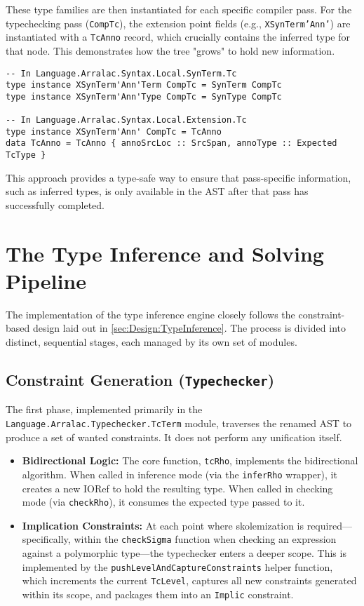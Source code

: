 These type families are then instantiated for each specific compiler pass. For the typechecking pass (\texttt{CompTc}), the extension point fields (e.g., \texttt{XSynTerm'Ann'}) are instantiated with a \texttt{TcAnno} record, which crucially contains the inferred type for that node. This demonstrates how the tree "grows" to hold new information.

\begin{verbatim}
-- In Language.Arralac.Syntax.Local.SynTerm.Tc
type instance XSynTerm'Ann'Term CompTc = SynTerm CompTc
type instance XSynTerm'Ann'Type CompTc = SynType CompTc

-- In Language.Arralac.Syntax.Local.Extension.Tc
type instance XSynTerm'Ann' CompTc = TcAnno
data TcAnno = TcAnno { annoSrcLoc :: SrcSpan, annoType :: Expected TcType }
\end{verbatim}

This approach provides a type-safe way to ensure that pass-specific information, such as inferred types, is only available in the AST after that pass has successfully completed.

\section{The Type Inference and Solving Pipeline}
\label{sec:Implementation:Pipeline}

The implementation of the type inference engine closely follows the constraint-based design laid out in \cref{sec:Design:TypeInference}. The process is divided into distinct, sequential stages, each managed by its own set of modules.

\subsection{Constraint Generation (\texttt{Typechecker})}
The first phase, implemented primarily in the \\ \texttt{Language.Arralac.Typechecker.TcTerm} module, traverses the renamed AST to produce a set of wanted constraints. It does not perform any unification itself.
\begin{itemize}
  \item \textbf{Bidirectional Logic:} The core function, \texttt{tcRho}, implements the bidirectional algorithm. When called in inference mode (via the \texttt{inferRho} wrapper), it creates a new IORef to hold the resulting type. When called in checking mode (via \texttt{checkRho}), it consumes the expected type passed to it.

  \item \textbf{Implication Constraints:} At each point where skolemization is required---specifically, within the \texttt{checkSigma} function when checking an expression against a polymorphic type---the typechecker enters a deeper scope. This is implemented by the \texttt{pushLevelAndCaptureConstraints} helper function, which increments the current \texttt{TcLevel}, captures all new constraints generated within its scope, and packages them into an \texttt{Implic} constraint.
\end{itemize}

